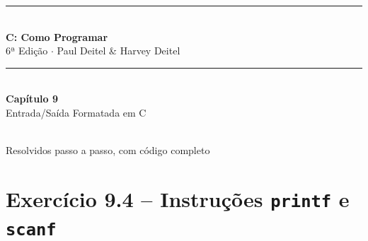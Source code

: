 \documentclass[12pt,a4paper]{article}
\begin{document}
\begin{titlepage}
  \centering\vspace*{2cm}
  {\color{deitelblue}\rule{\linewidth}{2pt}}\\[0.4cm]
  {\huge\bfseries\color{deitelblue}C: Como Programar}\\[0.2cm]
  {\large\color{deitelblue}6ª Edição $\cdot$ Paul Deitel \& Harvey Deitel}\\[0.2cm]
  {\color{deitelblue}\rule{\linewidth}{2pt}}\\[1cm]
  {\LARGE\bfseries Capítulo 9}\\[0.3cm]
  {\Large\color{deitelblue!80}Entrada/Saída Formatada em C}\\[0.8cm]
  \begin{tcolorbox}[colback=deitellightblue,colframe=deitelblue,width=0.85\linewidth]
    \\[0.2cm]
    {\normalsize Resolvidos passo a passo, com código completo}
  \end{tcolorbox}
\end{titlepage}

\tableofcontents\newpage

\section{Exercício 9.4 -- Instruções \texttt{printf} e \texttt{scanf}}
\end{document}

